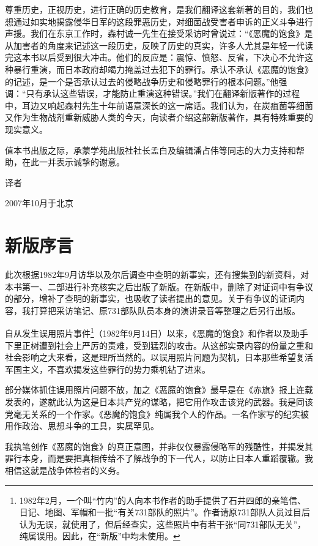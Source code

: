 \documentclass[a4paper,12pt,UTF8,twoside]{ctexbook}
\begin{document}
尊重历史，正视历史，进行正确的历史教育，是我们翻译这套新著的目的，我们也想通过如实地揭露侵华日军的这段罪恶历史，对细菌战受害者申诉的正义斗争进行声援。我们在东京工作时，森村诚一先生在接受采访时曾说过：“《恶魔的饱食》是从加害者的角度来记述这一段历史，反映了历史的真实，许多人尤其是年轻一代读完这本书以后受到很大冲击。他们的反应是：震惊、愤怒、反省，下决心不允许这种暴行重演，而日本政府却竭力掩盖过去犯下的罪行。承认不承认《恶魔的饱食》的记述，是一个是否承认过去的侵略战争历史和侵略罪行的根本问题。”他强调：“只有承认这些错误，才能防止重演这种错误。”我们在翻译新版著作的过程中，耳边又响起森村先生十年前语意深长的这一席话。我们认为，在炭疽菌等细菌又作为生物战剂重新威胁人类的今天，向读者介绍这部新版著作，具有特殊重要的现实意义。

值本书出版之际，承蒙学苑出版社社长孟白及编辑潘占伟等同志的大力支持和帮助，在此一并表示诚挚的谢意。

译者

2007年10月于北京

\chapter{新版序言}

此次根据1982年9月访华以及尔后调查中查明的新事实，还有搜集到的新资料，对本书第一、二部进行补充核实之后出版了新版。在新版中，删除了对证词中有争议的部分，增补了查明的新事实，也吸收了读者提出的意见。关于有争议的证词内容，我打算把采访笔记、原731部队队员本身的演讲录音等整理之后另行出版。

自从发生误用照片事件\footnote{1982年2月，一个叫“竹内”的人向本书作者的助手提供了石井四郎的亲笔信、日记、地图、军帽和一批“有关731部队的照片”。作者请原731部队人员过目后认为无误，就使用了，但后经查实，这些照片中有若干张“同731部队无关”，纯属误用。因此，在“新版”中均未使用。}（1982年9月14日）以来，《恶魔的饱食》和作者以及助手下里正树遭到社会上严厉的责难，受到猛烈的攻击。从这部实录内容的份量之重和社会影响之大来看，这是理所当然的。以误用照片问题为契机，日本那些希望复活军国主义，不喜欢揭发这些罪行的势力乘机钻了进来。

部分媒体抓住误用照片问题不放，加之《恶魔的饱食》最早是在《赤旗》报上连载发表的，遂就此认为这是日本共产党的谋略，把它用作攻击该党的武器。我是同该党毫无关系的一个作家。《恶魔的饱食》纯属我个人的作品。一名作家写的纪实被用作政治、思想斗争的工具，实属罕见。

我执笔创作《恶魔的饱食》的真正意图，并非仅仅暴露侵略军的残酷性，并揭发其罪行本身，而是要把真相传给不了解战争的下一代人，以防止日本人重蹈覆辙。我相信这就是战争体检者的义务。
\end{document}
